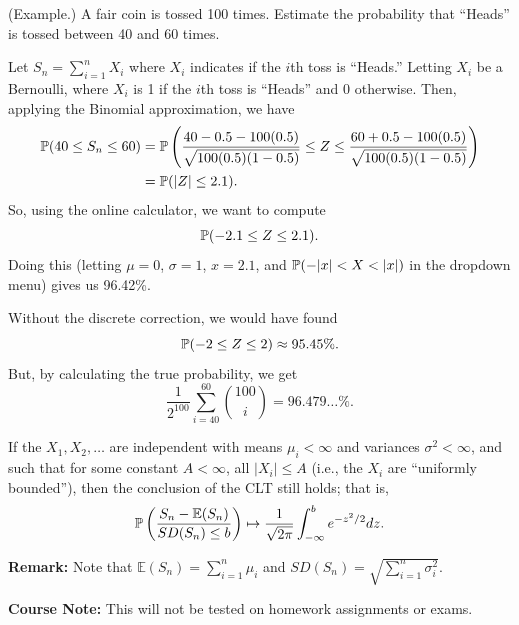 \documentclass[letterpaper]{article}
\begin{document}
\begin{mdframed}[]
    (Example.) A fair coin is tossed 100 times. Estimate the probability that ``Heads'' is tossed between 40 and 60 times. 

    \bigskip 

    Let $S_n = \sum_{i = 1}^{n} X_i$ where $X_i$ indicates if the $i$th toss is ``Heads.'' Letting $X_i$ be a Bernoulli, where $X_i$ is 1 if the $i$th toss is ``Heads'' and 0 otherwise. Then, applying the Binomial approximation, we have  
    \begin{equation*}
        \begin{aligned}
            \mathbb{P}(40 \leq S_n \leq 60) &= \mathbb{P}\left(\frac{40 - 0.5 - 100(0.5)}{\sqrt{100(0.5)(1 - 0.5)}} \leq Z \leq \frac{60 + 0.5 - 100(0.5)}{\sqrt{100(0.5)(1 - 0.5)}}\right) \\ 
                &= \mathbb{P}(|Z| \leq 2.1).
        \end{aligned}
    \end{equation*}
    So, using the online calculator, we want to compute 
    \[\mathbb{P}(-2.1 \leq Z \leq 2.1).\]
    Doing this (letting $\mu = 0$, $\sigma = 1$, $x = 2.1$, and $\mathbb{P}(-|x| < X < |x|)$ in the dropdown menu) gives us 96.42\%.

    \bigskip 

    Without the discrete correction, we would have found 
    \[\mathbb{P}(-2 \leq Z \leq 2) \approx 95.45\%.\]
    But, by calculating the true probability, we get 
    \[\frac{1}{2^{100}} \sum_{i = 40}^{60} \binom{100}{i} = 96.479\dots\%.\]
\end{mdframed}


\begin{theorem}{}{}
    If the $X_1, X_2, \dots$ are independent with means $\mu_i < \infty$ and variances $\sigma^2 < \infty$, and such that for some constant $A < \infty$, all $|X_i| \leq A$ (i.e., the $X_i$ are ``uniformly bounded''), then the conclusion of the CLT still holds; that is, 
    \[\mathbb{P}\left(\frac{S_n - \mathbb{E}(S_n)}{SD(S_n) \leq b}\right) \mapsto \frac{1}{\sqrt{2\pi}} \int_{-\infty}^{b} e^{-z^2 / 2}dz.\]
\end{theorem}
\textbf{Remark:} Note that $\mathbb{E}(S_n) = \sum_{i = 1}^{n} \mu_i$ and $SD(S_n) = \sqrt{\sum_{i = 1}^{n} \sigma_i^2}$. 

\textbf{Course Note:} This will not be tested on homework assignments or exams.
\end{document}
